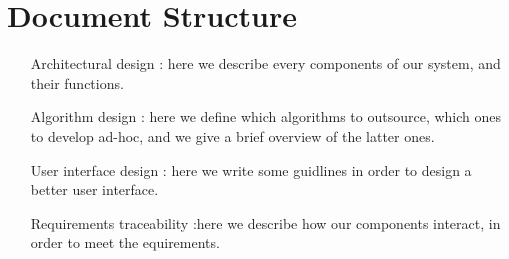 \section{Document Structure}
\begin{itemize} 
 \item[Architectural design]: here we describe every components of our system, and their functions.
 \item[Algorithm design]: here we define which algorithms to outsource, which ones to develop ad-hoc, 
 and we give a brief overview of the latter ones.
 \item[User interface design]: here we write some guidlines in order to design a better user interface.
 \item[Requirements traceability]:here we describe how our components interact, in order to meet the equirements.
\end{itemize}

